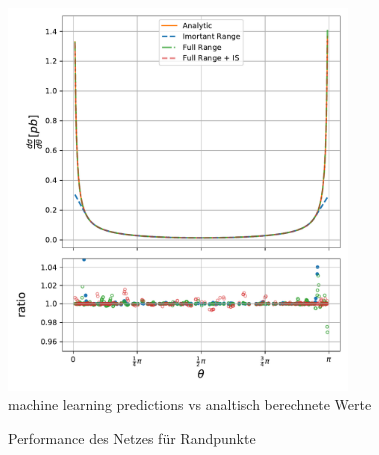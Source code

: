 \begin{figure}[tbp]
	\centering
	\includegraphics[width=9cm]{graphics/3}
	\caption{machine learning predictions vs analtisch berechnete Werte}
	\label{partonic_theta_model}
\end{figure}

\begin{figure}[tbp]
	\centering
	\caption{Performance des Netzes für Randpunkte}
	\label{3.1 / 3.2}
\end{figure}

